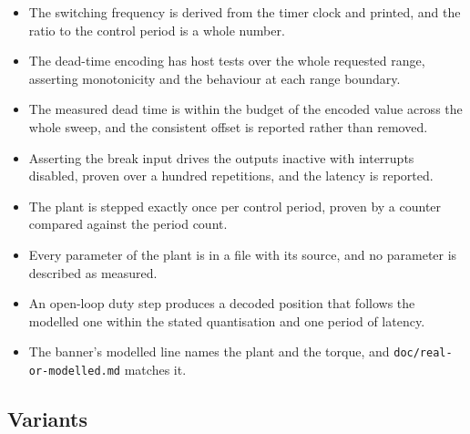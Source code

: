 \begin{itemize}
\item The switching frequency is derived from the timer clock and printed, and
the ratio to the control period is a whole number.
\item The dead-time encoding has host tests over the whole requested range,
asserting monotonicity and the behaviour at each range boundary.
\item The measured dead time is within the budget of the encoded value across
the whole sweep, and the consistent offset is reported rather than removed.
\item Asserting the break input drives the outputs inactive with interrupts
disabled, proven over a hundred repetitions, and the latency is reported.
\item The plant is stepped exactly once per control period, proven by a counter
compared against the period count.
\item Every parameter of the plant is in a file with its source, and no
parameter is described as measured.
\item An open-loop duty step produces a decoded position that follows the
modelled one within the stated quantisation and one period of latency.
\item The banner's modelled line names the plant and the torque, and
\texttt{doc/real-or-modelled.md} matches it.
\end{itemize}

\subsection*{Variants}

